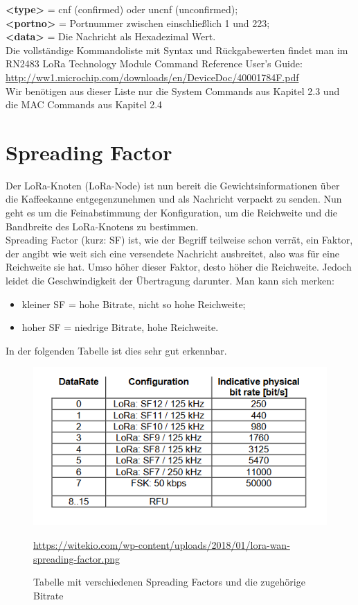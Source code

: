 \textbf{<type>} = cnf (confirmed) oder uncnf (unconfirmed);\\

\textbf{<portno>} = Portnummer zwischen einschließlich 1 und 223;\\

\textbf{<data>} = Die Nachricht als Hexadezimal Wert.\\
\noindent
Die vollständige Kommandoliste mit Syntax und Rückgabewerten findet man im RN2483 LoRa Technology Module Command Reference User’s Guide: \url{http://ww1.microchip.com/downloads/en/DeviceDoc/40001784F.pdf}\\
Wir benötigen aus dieser Liste nur die System Commands aus Kapitel 2.3 und die MAC Commands aus Kapitel 2.4

\section{Spreading Factor} \label{sec:spreadingfactor}
Der LoRa-Knoten (LoRa-Node) ist nun bereit die Gewichtsinformationen über die Kaffeekanne entgegenzunehmen und als Nachricht verpackt zu senden.
Nun geht es um die Feinabstimmung der Konfiguration, um die Reichweite und die Bandbreite des LoRa-Knotens zu bestimmen.\\
Spreading Factor (kurz: SF) ist, wie der Begriff teilweise schon verrät, ein Faktor, der angibt wie weit sich eine versendete Nachricht ausbreitet, also was für eine Reichweite sie hat. Umso höher dieser Faktor, desto höher die Reichweite. Jedoch leidet die Geschwindigkeit der Übertragung darunter. Man kann sich merken: 
\begin{itemize}
    \item kleiner SF = hohe Bitrate, nicht so hohe Reichweite;
    \item hoher SF = niedrige Bitrate, hohe Reichweite.
\end{itemize} 
In der folgenden Tabelle ist dies sehr gut erkennbar. 
\begin{figure}[H]
    \center
    \includegraphics[width=15cm]{Bilder/lora-10.png}\\
    \caption{Tabelle mit verschiedenen Spreading Factors und die zugehörige Bitrate}
    \begin{center} \quelle\url{https://witekio.com/wp-content/uploads/2018/01/lora-wan-spreading-factor.png} \end{center}
        \label{fig:spreading-factor}
\end{figure}
